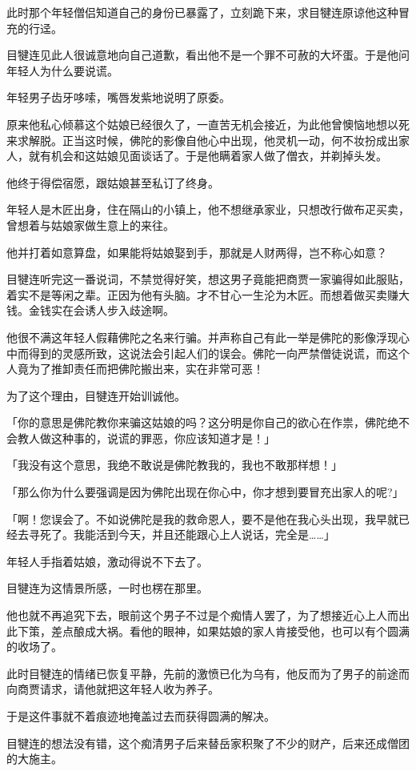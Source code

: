 \documentclass[twoside,openany]{book}
\begin{document}
此时那个年轻僧侣知道自己的身份已暴露了，立刻跪下来，求目犍连原谅他这种冒充的行迳。

目犍连见此人很诚意地向自己道歉，看出他不是一个罪不可赦的大坏蛋。于是他问年轻人为什么要说谎。

年轻男子齿牙哆嗦，嘴唇发紫地说明了原委。

原来他私心倾慕这个姑娘已经很久了，一直苦无机会接近，为此他曾懊恼地想以死来求解脱。正当这时候，佛陀的影像自他心中出现，他灵机一动，何不妆扮成出家人，就有机会和这姑娘见面谈话了。于是他瞒着家人做了僧衣，并剃掉头发。

他终于得偿宿愿，跟姑娘甚至私订了终身。

年轻人是木匠出身，住在隔山的小镇上，他不想继承家业，只想改行做布疋买卖，曾想着与姑娘家做生意上的来往。

他并打着如意算盘，如果能将姑娘娶到手，那就是人财两得，岂不称心如意？

目犍连听完这一番说词，不禁觉得好笑，想这男子竟能把商贾一家骗得如此服贴，着实不是等闲之辈。正因为他有头脑。才不甘心一生沦为木匠。而想着做买卖赚大钱。金钱实在会诱人步入歧途啊。

他很不满这年轻人假藉佛陀之名来行骗。并声称自己有此一举是佛陀的影像浮现心中而得到的灵感所致，这说法会引起人们的误会。佛陀一向严禁僧徒说谎，而这个人竟为了推卸责任而把佛陀搬出来，实在非常可恶！

为了这个理由，目犍连开始训诚他。

「你的意思是佛陀教你来骗这姑娘的吗？这分明是你自己的欲心在作祟，佛陀绝不会教人做这种事的，说谎的罪恶，你应该知道才是！」

「我没有这个意思，我绝不敢说是佛陀教我的，我也不敢那样想！」

「那么你为什么要强调是因为佛陀出现在你心中，你才想到要冒充出家人的呢?」

「啊！您误会了。不如说佛陀是我的救命恩人，要不是他在我心头出现，我早就已经去寻死了。我能活到今天，并且还能跟心上人说话，完全是……」

年轻人手指着姑娘，激动得说不下去了。

目犍连为这情景所感，一时也楞在那里。

他也就不再追究下去，眼前这个男子不过是个痴情人罢了，为了想接近心上人而出此下策，差点酿成大祸。看他的眼神，如果姑娘的家人肯接受他，也可以有个圆满的收场了。

此时目犍连的情绪已恢复平静，先前的激愤已化为乌有，他反而为了男子的前途而向商贾请求，请他就把这年轻人收为养子。

于是这件事就不着痕迹地掩盖过去而获得圆满的解决。

目犍连的想法没有错，这个痴清男子后来替岳家积聚了不少的财产，后来还成僧团的大施主。
\end{document}
